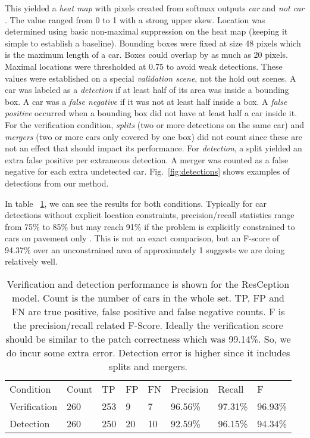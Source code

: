 \documentclass[runningheads]{llncs}
\begin{document}
This yielded a {\it heat map} with pixels  created from softmax outputs {\it car}   and {\it not car} . The value ranged from 0 to 1 with a strong upper skew. Location was determined using basic non-maximal suppression on the heat map (keeping it simple to establish a baseline). Bounding boxes were fixed at size 48 pixels which is the maximum length of a car. Boxes could overlap by as much as 20 pixels. Maximal locations were thresholded at 0.75 to avoid weak detections. These values were established on a special {\it validation scene}, not the hold out scenes. A car was labeled as a {\it detection} if at least half of its area was inside a bounding box. A car was a {\it false negative} if it was not at least half inside a box. A {\it false positive} occurred when a bounding box did not have at least half a car inside it. For the verification condition, {\it splits} (two or more detections on the same car) and {\it mergers} (two or more cars only covered by one box) did not count since these are not an effect that should impact its performance. For {\it detection}, a split yielded an extra false positive per extraneous detection. A merger was counted as a false negative for each extra undetected car. Fig.~\ref{fig:detections} shows examples of detections from our method. 

In table ~\ref{table:detect_correct}, we can see the results for both conditions.  Typically for car detections without explicit location constraints, precision/recall statistics range from 75\% to 85\% \cite{Chen13,VEDAI} but may reach 91\% if the problem is explicitly constrained to cars on pavement only \cite{Moranduzzo14,Holt09,Kamenetsky15}. This is not an exact comparison, but an F-score of 94.37\% over an unconstrained area of approximately 1  suggests we are doing relatively well. 

\setlength{\tabcolsep}{4pt}
\begin{table}
\begin{center}
\caption{ Verification and detection performance is shown for the ResCeption model. Count is the number of cars in the whole set. TP, FP and FN are true positive, false positive and false negative counts. F is the precision/recall related F-Score. Ideally the verification score should be similar to the patch correctness which was 99.14\%. So, we do incur some extra error. Detection error is higher since it includes splits and mergers. }
\label{table:detect_correct}
\begin{tabular}{llllllll}
\hline\noalign{\smallskip}
Condition & Count & TP & FP & FN & Precision & Recall & F\\
\noalign{\smallskip}
\hline
\noalign{\smallskip}
Verification &260& 253 & 9 & 7 & 96.56\% & 97.31\% & 96.93\%\\
Detection & 260 & 250 & 20 & 10 & 92.59\% & 96.15\% & 94.34\%\\
\hline
\end{tabular}
\end{center}
\end{table}
\setlength{\tabcolsep}{1.4pt}
\end{document}
